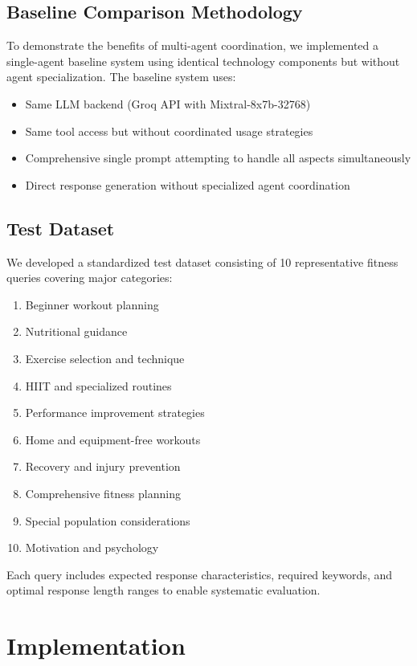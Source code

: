 \documentclass[conference]{IEEEtran}
\begin{document}
\subsection{Baseline Comparison Methodology}

To demonstrate the benefits of multi-agent coordination, we implemented a single-agent baseline system using identical technology components but without agent specialization. The baseline system uses:

\begin{itemize}
\item Same LLM backend (Groq API with Mixtral-8x7b-32768)
\item Same tool access but without coordinated usage strategies
\item Comprehensive single prompt attempting to handle all aspects simultaneously
\item Direct response generation without specialized agent coordination
\end{itemize}

\subsection{Test Dataset}

We developed a standardized test dataset consisting of 10 representative fitness queries covering major categories:

\begin{enumerate}
\item Beginner workout planning
\item Nutritional guidance
\item Exercise selection and technique
\item HIIT and specialized routines
\item Performance improvement strategies
\item Home and equipment-free workouts
\item Recovery and injury prevention
\item Comprehensive fitness planning
\item Special population considerations
\item Motivation and psychology
\end{enumerate}

Each query includes expected response characteristics, required keywords, and optimal response length ranges to enable systematic evaluation.

\section{Implementation}
\end{document}
